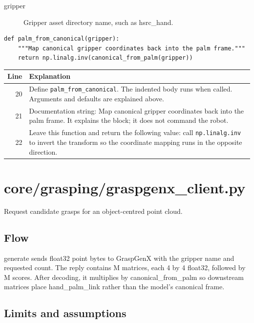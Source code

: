 \documentclass[11pt,a4paper]{book}
\begin{document}
\begin{description}
\item[gripper] Gripper asset directory name, such as hsrc\_hand.
\end{description}

\begin{lstlisting}[firstnumber=20]
def palm_from_canonical(gripper):
    """Map canonical gripper coordinates back into the palm frame."""
    return np.linalg.inv(canonical_from_palm(gripper))
\end{lstlisting}

\begin{longtable}{r p{}}

\textbf{Line} & \textbf{Explanation} \\ \hline \endhead

20 & Define \texttt{palm\_from\_canonical}. The indented body runs when called. Arguments and defaults are explained above. \\

21 & Documentation string: Map canonical gripper coordinates back into the palm frame. It explains the block; it does not command the robot. \\

22 & Leave this function and return the following value: call \texttt{np.linalg.inv} to invert the transform so the coordinate mapping runs in the opposite direction. \\

\end{longtable}

\chapter{core/grasping/graspgenx\_client.py}

Request candidate grasps for an object-centred point cloud.

\section*{Flow}

generate sends float32 point bytes to GraspGenX with the gripper name and requested count. The reply contains M matrices, each 4 by 4 float32, followed by M scores. After decoding, it multiplies by canonical\_from\_palm so downstream matrices place hand\_palm\_link rather than the model's canonical frame.

\section*{Limits and assumptions}
\end{document}
